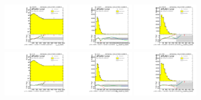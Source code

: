 \begin{figure}[htbp!]
\begin{center}
\includegraphics[width=0.25\textwidth,angle=-90]{figures/boosted/Reweight/Fits/Moriond_NoTag_3Trk_lead_Incl_sublHCand_Pt_m_1.pdf}
\includegraphics[width=0.25\textwidth,angle=-90]{figures/boosted/Reweight/Fits/Moriond_NoTag_3Trk_lead_Incl_sublHCand_trk0_Pt.pdf}
\includegraphics[width=0.25\textwidth,angle=-90]{figures/boosted/Reweight/Fits/Moriond_NoTag_3Trk_lead_Incl_sublHCand_trk1_Pt.pdf} \\
\includegraphics[width=0.25\textwidth,angle=-90]{figures/boosted/Reweight/Fits/Moriond_bkg_0_NoTag_3Trk_lead_Incl_sublHCand_Pt_m_1.pdf}
\includegraphics[width=0.25\textwidth,angle=-90]{figures/boosted/Reweight/Fits/Moriond_bkg_0_NoTag_3Trk_lead_Incl_sublHCand_trk0_Pt.pdf}
\includegraphics[width=0.25\textwidth,angle=-90]{figures/boosted/Reweight/Fits/Moriond_bkg_0_NoTag_3Trk_lead_Incl_sublHCand_trk1_Pt.pdf} \\

\end{center}
\end{figure}
